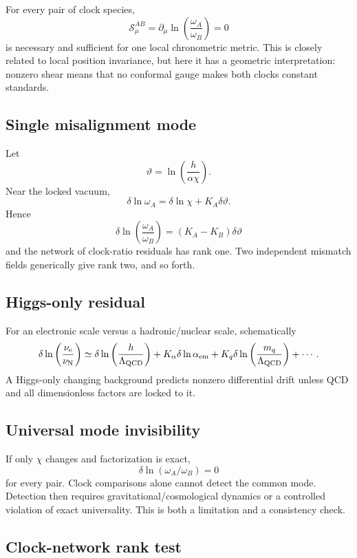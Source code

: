 \documentclass[11pt,a4paper]{article}
\begin{document}
For every pair of clock species,
\[
 \boxed{
 \mathcal S^{AB}_\mu
 =\partial_\mu\ln\left(\frac{\omega_A}{\omega_B}\right)=0
 }
\]
is necessary and sufficient for one local chronometric metric. This is closely related to local position invariance, but here it has a geometric interpretation: nonzero shear means that no conformal gauge makes both clocks constant standards.

\subsection{Single misalignment mode}

Let
\[
 \vartheta=\ln\left(\frac{h}{\alpha\chi}\right).
\]
Near the locked vacuum,
\[
 \delta\ln\omega_A=\delta\ln\chi+K_A\delta\vartheta.
\]
Hence
\[
 \boxed{
 \delta\ln\left(\frac{\omega_A}{\omega_B}\right)
 =(K_A-K_B)\delta\vartheta
 }
\]
and the network of clock-ratio residuals has rank one. Two independent mismatch fields generically give rank two, and so forth.

\subsection{Higgs-only residual}

For an electronic scale versus a hadronic/nuclear scale, schematically
\[
 \delta\ln\left(\frac{\nu_{\rm e}}{\nu_{\rm N}}\right)
 \simeq
 \delta\ln\left(\frac{h}{\Lambda_{\rm QCD}}\right)
 +K_\alpha\delta\ln\alpha_{\rm em}
 +K_q\delta\ln\left(\frac{m_q}{\Lambda_{\rm QCD}}\right)
 +\cdots.
\]
A Higgs-only changing background predicts nonzero differential drift unless QCD and all dimensionless factors are locked to it.

\subsection{Universal mode invisibility}

If only $\chi$ changes and factorization is exact,
\[
 \delta\ln(\omega_A/\omega_B)=0
\]
for every pair. Clock comparisons alone cannot detect the common mode. Detection then requires gravitational/cosmological dynamics or a controlled violation of exact universality. This is both a limitation and a consistency check.

\subsection{Clock-network rank test}
\end{document}
